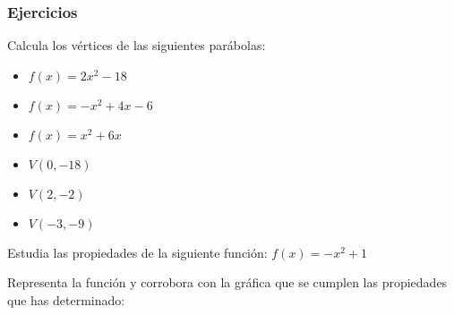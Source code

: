 \subsubsection{Ejercicios}
\begin{ex}
	Calcula los vértices de las siguientes parábolas: 
	\begin{itemize}
		\item $f(x)=2x^2-18$
		\item $f(x)=-x^2+4x-6$
		\item $f(x)=x^2+6x$
	\end{itemize}
	\begin{sol}
		\begin{itemize}		
			\item $V(0, -18)$
			\item $V(2, -2)$
			\item $V(-3, -9)$
		\end{itemize}
	\end{sol}
\end{ex}

\begin{ex}
	Estudia las propiedades de la siguiente función: $f(x) = -x^2+1$
	\begin{sol}
	Representa la función y corrobora con la gráfica que se cumplen las propiedades que has determinado:\\
	\end{sol}
\end{ex}
